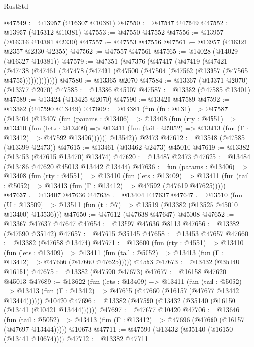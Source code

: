 \begin{lexlean}{RustStd}
\begin{coremodule}
@47549 := @13957 (@16307 @10381)
@47550 := @47547 @47549
@47552 := @13957 (@16312 @10381)
@47553 := @47550 @47552
@47556 := @13957 (@16316 @10381 @2330)
@47557 := @47553 @47556
@47561 := @13957 (@16321 @2357 @2330 @2355)
@47562 := @47557 @47561
@47565 := @14028 (@14029 (@16327 @10381))
@47579 := @47351
    (@47376
      (@47417
        (@47419
          (@47421
            (@47438
              (@47461 (@47478 (@47491 (@47500 (@47504 (@47562 (@13957 (@47565 @4755)))))))))))))
@47580 := @13365 @2070
@47584 := @13367 (@13371 @2070) (@13377 @2070)
@47585 := @13386 @45007
@47587 := @13382 (@47585 @13401)
@47589 := @13424 (@13425 @2070)
@47590 := @13420 @47589
@47592 := @13382 (@47590 @13449)
@47609 := @13381
    (fun (fn : @131) =>
    @47587
      (@13404
        (@13407
          (fun (params : @13406) =>
          @13408
            (fun (rty : @4551) =>
            @13410
              (fun (lets : @13409) =>
              @13411 (fun (tail : @5052) => @13413 (fun (Γ : @13412) => @47592 @13496))))))
        @13542))
    @2473
@47612 := @13548 (@47585 (@13399 @2473))
@47615 := @13461 (@13462 @2473) @45010
@47619 := @13382 (@13453 (@47615 @13470) @13474)
@47620 := @13487 @2473
@47625 := @13484 (@13486 @47620 @45013 @13442 @13444)
@47636 := fun (params : @13406) =>
  @13408
    (fun (rty : @4551) =>
    @13410
      (fun (lets : @13409) =>
      @13411 (fun (tail : @5052) => @13413 (fun (Γ : @13412) => @47592 (@47619 @47625)))))
@47637 := @13407 @47636
@47638 := @13404 @47637
@47647 := @13510
    (fun (U : @13509) => @13511 (fun (t : @7) => @13519 (@13382 (@13525 @45010 @13400) @13536)))
@47650 := @47612 (@47638 @47647) @45008
@47652 := @13367 @47637 @47647
@47654 := @13597 @47636 @8113
@47656 := @13382 (@47590 @35142)
@47657 := @47615 @35145
@47658 := @13453 @47657
@47660 := @13382 (@47658 @13474)
@47671 := @13600
    (fun (rty : @4551) =>
    @13410
      (fun (lets : @13409) =>
      @13411 (fun (tail : @5052) => @13413 (fun (Γ : @13412) => @47656 (@47660 @47625)))))
    @4553
@47673 := @13432 (@35140 @16151)
@47675 := @13382 (@47590 @47673)
@47677 := @16158 @47620 @45013
@47689 := @13622
    (fun (lets : @13409) =>
    @13411
      (fun (tail : @5052) =>
      @13413 (fun (Γ : @13412) => @47675 (@47660 (@16157 (@47677 @13442 @13444))))))
    @10420
@47696 := @13382 (@47590 (@13432 (@35140 (@16150 (@13441 (@10421 @13444))))))
@47697 := @47677 @10420
@47706 := @13646
    (fun (tail : @5052) => @13413 (fun (Γ : @13412) => @47696 (@47660 (@16157 (@47697 @13444)))))
    @10673
@47711 := @47590 (@13432 (@35140 (@16150 (@13441 @10674))))
@47712 := @13382 @47711

\end{coremodule}
\end{lexlean}
